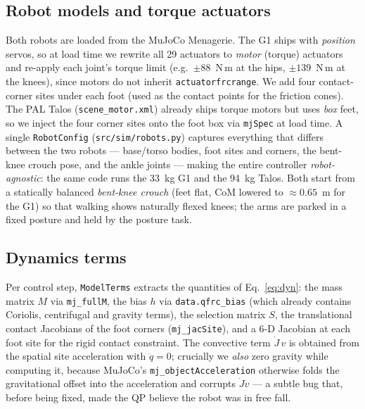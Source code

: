 \documentclass[11pt]{article}
\begin{document}
\subsection{Robot models and torque actuators}
\label{sec:impl:models}
Both robots are loaded from the MuJoCo Menagerie. The G1 ships with \emph{position}
servos, so at load time we rewrite all 29 actuators to \emph{motor} (torque)
actuators and re-apply each joint's torque limit (e.g.\ $\pm88$~N\,m at the hips,
$\pm139$~N\,m at the knees), since motors do not inherit \texttt{actuatorfrcrange}.
We add four contact-corner sites under each foot (used as the contact points for
the friction cones). The PAL Talos (\texttt{scene\_motor.xml}) already ships torque
motors but uses \emph{box} feet, so we inject the four corner sites onto the foot
box via \texttt{mjSpec} at load time. A single \texttt{RobotConfig}
(\texttt{src/sim/robots.py}) captures everything that differs between the two
robots --- base/torso bodies, foot sites and corners, the bent-knee crouch pose,
and the ankle joints --- making the entire controller \emph{robot-agnostic}: the
same code runs the 33~kg G1 and the 94~kg Talos. Both start from a statically
balanced \emph{bent-knee crouch} (feet flat, CoM lowered to $\approx\!0.65$~m for
the G1) so that walking shows naturally flexed knees; the arms are parked in a
fixed posture and held by the posture task.

\subsection{Dynamics terms}
\label{sec:impl:dyn}
Per control step, \texttt{ModelTerms} extracts the quantities of
Eq.~\eqref{eq:dyn}: the mass matrix $M$ via \texttt{mj\_fullM}, the bias $h$ via
\texttt{data.qfrc\_bias} (which already contains Coriolis, centrifugal and gravity
terms), the selection matrix $S$, the translational contact Jacobians of the foot
corners (\texttt{mj\_jacSite}), and a 6-D Jacobian at each foot site for the rigid
contact constraint. The convective term $\dot J\,v$ is obtained from the spatial
site acceleration with $\ddot q\!=\!0$; crucially we \emph{also} zero gravity while
computing it, because MuJoCo's \texttt{mj\_objectAcceleration} otherwise folds the
gravitational offset into the acceleration and corrupts $\dot J v$ --- a subtle bug
that, before being fixed, made the QP believe the robot was in free fall.
\end{document}
